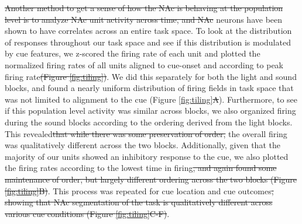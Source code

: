\documentclass[11pt]{article}
\providecommand{\DIFadd}[1]{{\protect\color{blue}\uwave{#1}}} %
\providecommand{\DIFdel}[1]{{\protect\color{red}\sout{#1}}}                      %
\providecommand{\DIFaddbegin}{} %
\providecommand{\DIFaddend}{} %
\providecommand{\DIFdelbegin}{} %
\providecommand{\DIFdelend}{} %
\newcommand{\DIFscaledelfig}{0.5}
\newlength{\DIFdelgraphicswidth} %
\newlength{\DIFdelgraphicsheight} %
\newcommand{\DIFaddincludegraphics}[2][]{{\color{blue}\fbox{\DIFOincludegraphics[#1]{#2}}}} %
\newcommand{\DIFdelincludegraphics}[2][]{%
\sbox{\DIFdelgraphicsbox}{\DIFOincludegraphics[#1]{#2}}%
\settoboxwidth{\DIFdelgraphicswidth}{\DIFdelgraphicsbox} %
\settoboxtotalheight{\DIFdelgraphicsheight}{\DIFdelgraphicsbox} %
\scalebox{\DIFscaledelfig}{%
\parbox[b]{\DIFdelgraphicswidth}{\usebox{\DIFdelgraphicsbox}\\[-\baselineskip] \rule{\DIFdelgraphicswidth}{0em}}\llap{\resizebox{\DIFdelgraphicswidth}{\DIFdelgraphicsheight}{%
\setlength{\unitlength}{\DIFdelgraphicswidth}%
\begin{picture}(1,1)%
\thicklines\linethickness{2pt} %
{\color[rgb]{1,0,0}\put(0,0){\framebox(1,1){}}}%
{\color[rgb]{1,0,0}\put(0,0){\line( 1,1){1}}}%
{\color[rgb]{1,0,0}\put(0,1){\line(1,-1){1}}}%
\end{picture}%
}\hspace*{3pt}}} %
} %
\DeclareRobustCommand{\DIFaddbegin}{\DIFOaddbegin \let\includegraphics\DIFaddincludegraphics} %
\DeclareRobustCommand{\DIFaddend}{\DIFOaddend \let\includegraphics\DIFOincludegraphics} %
\DeclareRobustCommand{\DIFdelbegin}{\DIFOdelbegin \let\includegraphics\DIFdelincludegraphics} %
\DeclareRobustCommand{\DIFdelend}{\DIFOaddend \let\includegraphics\DIFOincludegraphics} %
\begin{document}
\DIFdelbegin \DIFdel{Another method to get a sense of how the NAc is behaving at the population level is to analyze NAc unit activity across time, and NAc }\DIFdelend \DIFaddbegin \DIFadd{NAc }\DIFaddend neurons have been shown to have correlates across an entire task space. To look at the distribution of responses throughout our task space and see if this distribution is modulated by cue features, we z-scored the firing rate of each unit and plotted the normalized firing rates of all units aligned to cue-onset and according to peak firing rate\DIFdelbegin \DIFdel{(Figure \ref{fig:tiling})}\DIFdelend . We did this separately for both the light and sound blocks, and found a nearly uniform distribution of firing fields in task space that was not limited to alignment to the cue (Figure \ref{fig:tiling}\DIFdelbegin \DIFdel{A}\DIFdelend ). Furthermore, to see if this population level activity was similar across blocks, we also organized firing during the sound blocks according to the ordering derived from the light blocks. This revealed\DIFdelbegin \DIFdel{that while there was some preservation of order, }\DIFdelend \DIFaddbegin \DIFadd{, that }\DIFaddend the overall firing was qualitatively different across the two blocks. Additionally, given that the majority of our units showed an inhibitory response to the cue, we also plotted the firing rates according to the lowest time in firing\DIFdelbegin \DIFdel{, and again found some maintenance of order, but largely different ordering across the two blocks (Figure \ref{fig:tiling}B)}\DIFdelend . This process was repeated for cue location and cue outcomes\DIFdelbegin \DIFdel{, showing that NAc segmentation of the task is qualitatively different across various cue conditions  (Figure \ref{fig:tiling}C-F)}\DIFdelend . 
\end{document}
